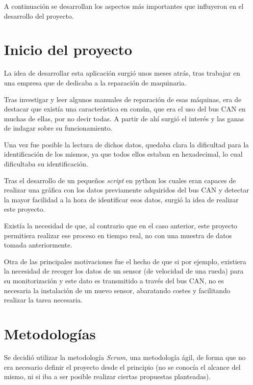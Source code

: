 
A continuación se desarrollan los aspectos más importantes que influyeron en el desarrollo del proyecto.

\section{Inicio del proyecto}\label{inicio_del_proyecto}

La idea de desarrollar esta aplicación surgió unos meses atrás, tras trabajar en una empresa que de dedicaba a la reparación de maquinaria.

Tras investigar y leer algunos manuales de reparación de esas máquinas, era de destacar que existía una característica en común, que era el uso del bus CAN en muchas de ellas, por no decir todas. A partir de ahí surgió el interés y las ganas de indagar sobre su funcionamiento.

Una vez fue posible la lectura de dichos datos, quedaba clara la dificultad para la identificación de los mismos, ya que todos ellos estaban en hexadecimal, lo cual dificultaba su identificación.

Tras el desarrollo de un pequeños \emph{script} en python los cuales eran capaces de realizar una gráfica con los datos previamente adquiridos del bus CAN y detectar la mayor facilidad a la hora de identificar esos datos, surgió la idea de realizar este proyecto.

Existía la necesidad de que, al contrario que en el caso anterior, este proyecto permitiera realizar ese proceso en tiempo real, no con una muestra de datos tomada anteriormente.

Otra de las principales motivaciones fue el hecho de que si por ejemplo, existiera la necesidad de recoger los datos de un sensor (de velocidad de una rueda) para su monitorización y este dato es transmitido a través del bus CAN, no es necesaria la instalación de un nuevo sensor, abaratando costes y facilitando realizar la tarea necesaria.

\section{Metodologías}\label{metodologias}

Se decidió utilizar la metodología \emph{Scrum}, una metodología ágil, de forma que no era necesario definir el proyecto desde el principio (no se conocía el alcance del mismo, ni si iba a ser posible realizar ciertas propuestas planteadas).

